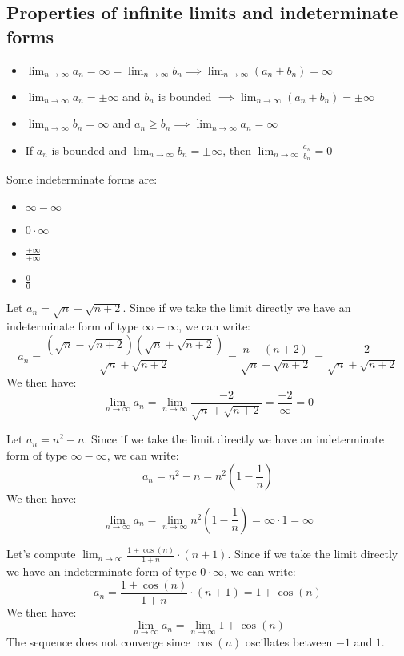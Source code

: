 \subsection{Properties of infinite limits and indeterminate forms}
\begin{itemize}[itemsep=1pt,label=$\circ$]
    \item $\lim_{n \to \infty} a_n = \infty = \lim_{n \to \infty} b_n \implies \lim_{n \to \infty} (a_n + b_n) = \infty$
    \item $\lim_{n \to \infty} a_n = \pm \infty$ and $b_n$ is bounded $\implies \lim_{n \to \infty} (a_n + b_n) = \pm \infty$
    \item $\lim_{n \to \infty} b_n = \infty$ and $a_n \geq b_n \implies \lim_{n \to \infty} a_n = \infty$
    \item If $a_n$ is bounded and $\lim_{n \to \infty} b_n = \pm \infty$, then $\lim_{n \to \infty} \frac{a_n}{b_n} = 0$
\end{itemize}
Some indeterminate forms are:
\begin{itemize}[itemsep=1pt,label=$\circ$]
    \item $\infty - \infty$
    \item $0 \cdot \infty$
    \item $\frac{\pm \infty}{\pm \infty}$
    \item $\frac{0}{0}$
\end{itemize}
\begin{eg}
    Let $a_n = \sqrt{n} - \sqrt{n + 2}$. Since if we take the limit directly we have an indeterminate form of type $\infty - \infty$, we can write:
    \[ a_n = \frac{(\sqrt{n} - \sqrt{n + 2})(\sqrt{n} + \sqrt{n + 2})}{\sqrt{n} + \sqrt{n + 2}} = \frac{n - (n + 2)}{\sqrt{n} + \sqrt{n + 2}} = \frac{-2}{\sqrt{n} + \sqrt{n + 2}} \]
    We then have:
    \[ \lim_{n \to \infty} a_n = \lim_{n \to \infty} \frac{-2}{\sqrt{n} + \sqrt{n + 2}} = \frac{-2}{\infty} = 0 \]
\end{eg}
\begin{eg}
    Let $a_n = n^2 - n$. Since if we take the limit directly we have an indeterminate form of type $\infty - \infty$, we can write:
    \[ a_n = n^2 - n = n^2 \left(1 - \frac{1}{n}\right) \]
    We then have:
    \[ \lim_{n \to \infty} a_n = \lim_{n \to \infty} n^2 \left(1 - \frac{1}{n}\right) = \infty \cdot 1 = \infty \]
\end{eg}
\begin{eg}
    Let's compute $\lim_{n \to \infty} \frac{1 + \cos (n)}{1 + n} \cdot (n + 1)$. Since if we take the limit directly we have an indeterminate form of type $0 \cdot \infty$, we can write:
    \[ a_n = \frac{1 + \cos (n)}{1 + n} \cdot (n + 1) = 1 + \cos (n) \]
    We then have:
    \[ \lim_{n \to \infty} a_n = \lim_{n \to \infty} 1 + \cos (n) \]
    The sequence does not converge since $\cos(n)$ oscillates between $-1$ and $1$.
\end{eg}
